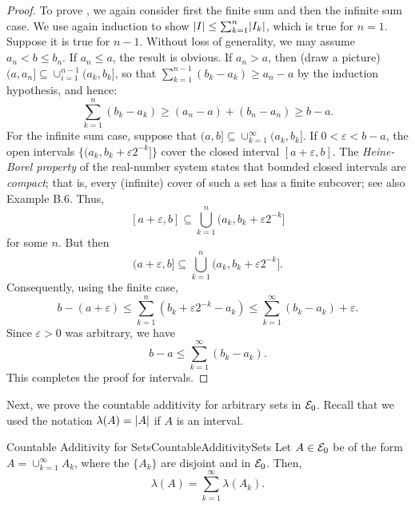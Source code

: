 \begin{proof}
	To prove , we again consider first the finite sum and then the infinite sum case. We use again induction to show \(\lvert I\rvert \le \sum_{k=1}^n \lvert I_k\rvert\), which is true for \(n=1\). Suppose it is true for \(n-1\). Without loss of generality, we may assume \(a_n < b \le b_n\). If \(a_n \le a\), the result is obvious. If \(a_n > a\), then (draw a picture) \(\lparen a, a_n \rbrack \subseteq \cup_{i=1}^{n-1} \lparen a_k, b_k \rbrack\), so that \(\sum_{k=1}^{n-1} (b_k - a_k) \ge a_n - a\) by the induction hypothesis, and hence:
	\begin{equation*}
		\sum_{k=1}^n (b_k - a_k) \ge (a_n - a) + (b_n - a_n) \ge b - a.
	\end{equation*}
	For the infinite sum case, suppose that \(\lparen a, b \rbrack \subseteq \cup_{k=1}^\infty \lparen a_k, b_k \rbrack\). If \(0 < \varepsilon < b - a\), the open intervals \(\{\lparen a_k, b_k + \varepsilon 2^{-k} \rbrack\}\) cover the closed interval \(\left[a + \varepsilon, b\right]\). The \textit{Heine-Borel property} of the real-number system states that bounded closed intervals are \textit{compact}; that is, every (infinite) cover of such a set has a finite subcover; see also Example B.6. Thus,
	\begin{equation*}
		\left[a + \varepsilon, b\right] \subseteq \bigcup_{k=1}^n \lparen a_k, b_k + \varepsilon 2^{-k} \rbrack
	\end{equation*}
	for some \(n\). But then
	\begin{equation*}
		\lparen a + \varepsilon, b \rbrack \subseteq \bigcup_{k=1}^n \lparen a_k, b_k + \varepsilon 2^{-k} \rbrack.
	\end{equation*}
	Consequently, using the finite case,
	\begin{equation*}
		b - (a + \varepsilon) \le \sum_{k=1}^n (b_k + \varepsilon 2^{-k} - a_k) \le \sum_{k=1}^\infty (b_k - a_k) + \varepsilon.
	\end{equation*}
	Since \(\varepsilon > 0\) was arbitrary, we have
	\begin{equation*}
		b - a \le \sum_{k=1}^\infty (b_k - a_k).
	\end{equation*}
	This completes the proof for intervals.
\end{proof}

Next, we prove the countable additivity for arbitrary sets in \(\mathcal{E}_0\). Recall that we used the notation \(\lambda(A) = \lvert A\rvert\) if \(A\) is an interval.

\begin{thm}{Countable Additivity for Sets}{CountableAdditivitySets}
	Let \(A \in \mathcal{E}_0\) be of the form \(A = \cup_{k=1}^\infty A_k\), where the \(\{A_k\}\) are disjoint and in \(\mathcal{E}_0\). Then,
	\begin{equation*}
		\lambda(A) = \sum_{k=1}^\infty \lambda(A_k).
	\end{equation*}
\end{thm}

